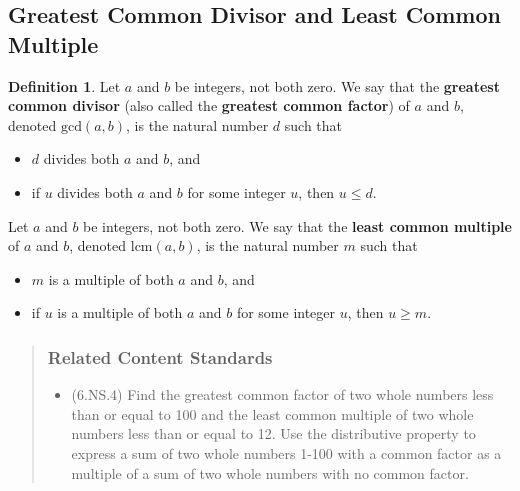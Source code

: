 \documentclass[
]{book}
\providecommand{\tightlist}{%
  \setlength{\itemsep}{0pt}\setlength{\parskip}{0pt}}
\theoremstyle{definition}
\newtheorem{definition}{Definition}[chapter]
\theoremstyle{definition}
\theoremstyle{definition}
\theoremstyle{remark}
\begin{document}
\hypertarget{greatest-common-divisor-and-least-common-multiple}{%
\subsection{Greatest Common Divisor and Least Common Multiple}\label{greatest-common-divisor-and-least-common-multiple}}

\begin{definition}
\protect\hypertarget{def:unnamed-chunk-180}{}{\label{def:unnamed-chunk-180} }Let \(a\) and \(b\) be integers, not both zero. We say that the \textbf{greatest common divisor} (also called the \textbf{greatest common factor}) of \(a\) and \(b\), denoted \(\mathrm{gcd}(a,b)\), is the natural number \(d\) such that

\begin{itemize}
\tightlist
\item
  \(d\) divides both \(a\) and \(b\), and
\item
  if \(u\) divides both \(a\) and \(b\) for some integer \(u\), then \(u\leq d\).
\end{itemize}

Let \(a\) and \(b\) be integers, not both zero. We say that the \textbf{least common multiple} of \(a\) and \(b\), denoted \(\mathrm{lcm}(a,b)\), is the natural number \(m\) such that

\begin{itemize}
\tightlist
\item
  \(m\) is a multiple of both \(a\) and \(b\), and
\item
  if \(u\) is a multiple of both \(a\) and \(b\) for some integer \(u\), then \(u\geq m\).
\end{itemize}
\end{definition}

\begin{quote}
\hypertarget{related-content-standards-30}{%
\subsubsection*{Related Content Standards}\label{related-content-standards-30}}

\begin{itemize}
\tightlist
\item
  (6.NS.4) Find the greatest common factor of two whole numbers less than or equal to 100 and the least common multiple of two whole numbers less than or equal to 12. Use the distributive property to express a sum of two whole numbers 1-100 with a common factor as a multiple of a sum of two whole numbers with no common factor.
\end{itemize}
\end{quote}
\end{document}
